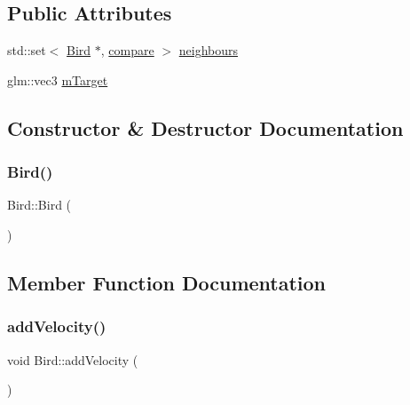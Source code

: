 \subsection*{Public Attributes}
\begin{DoxyCompactItemize}
\item 
std\+::set$<$ \hyperlink{classBird}{Bird} $\ast$, \hyperlink{structBird_1_1compare}{compare} $>$ \hyperlink{classBird_a30992001074a4c312bfdb40a745dc3f8}{neighbours}
\item 
glm\+::vec3 \hyperlink{classBird_a752294b0f405f7efec1eb0c135ab236b}{m\+Target}
\end{DoxyCompactItemize}


\subsection{Constructor \& Destructor Documentation}
\mbox{\label{classBird_a7c1b36856fe3a89d6098ec2b8a10ae8d}} 
\subsubsection{\texorpdfstring{Bird()}{Bird()}}
{\footnotesize\ttfamily Bird\+::\+Bird (\begin{DoxyParamCaption}{ }\end{DoxyParamCaption})}



\subsection{Member Function Documentation}
\mbox{\label{classBird_a17574e6ab712a32bec19ba9b709bf903}} 
\subsubsection{\texorpdfstring{add\+Velocity()}{addVelocity()}}
{\footnotesize\ttfamily void Bird\+::add\+Velocity (\begin{DoxyParamCaption}{ }\end{DoxyParamCaption})}

\mbox{\label{classBird_a41caabaf3f9fb37d0583f6384f12d9a1}} 
